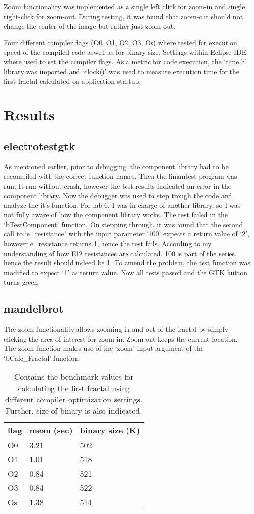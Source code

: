 \documentclass[a4paper,11pt,twoside]{article}
\begin{document}
Zoom functionality was implemented as a single left click for zoom-in
and single right-click for zoom-out. During testing, it was found that zoom-out
should not change the center of the image but rather just zoom-out.

Four different compiler flags (O0, O1, O2, O3, Os) where tested for execution
speed of the compiled code aswell as for binary size. Settings within
Eclipse IDE where used to set the compiler flags. As a metric for code
execution, the `time.h' library was imported and `clock()' was used to measure
execution time for the first fractal calculated on application startup.

\section{Results}
\subsection{electrotestgtk}
As mentioned earlier, prior to debugging, the component library had to be
recompiled with the correct function names. Then the linumtest program was
run. It run without crash, however the test results indicated an error
in the component library. Now the debugger was used to step trough the code
and analyze the it's function. For lab 6, I was in charge of another library,
so I was not fully aware of how the component library works. The test failed
in the `bTestComponent' function. On stepping through, it was found that the
second call to `e\_resistance' with the input parameter `100' expects a return
value of `2', however e\_resistance returns 1, hence the test fails. According
to my understanding of how E12 resistances are calculated, 100 is part of the
series, hence the result should indeed be 1. To amend the problem, the test
function was modified to expect `1' as return value. Now all tests passed
and the GTK button turns green.

\subsection{mandelbrot}
The zoom functionality allows zooming in and out of the fractal by simply
clicking the area of interest for zoom-in. Zoom-out keeps the current location.
The zoom function makes use of the `zoom' input argument of the `bCalc\_Fractal'
function.

\begin{table}[]
\centering
\caption{Contains the benchmark values for calculating the first fractal using
different compiler optimization settings. Further, size of binary is also indicated.}
\label{tab:benchmark}
\begin{tabular}{lll}
flag & mean (sec) & binary size (K) \\ \hline
O0   & 3.21       & 502   \\
O1   & 1.01       & 518   \\
O2   & 0.84       & 521   \\
O3   & 0.84       & 522   \\
Os   & 1.38       & 514
\end{tabular}
\end{table}
\end{document}
